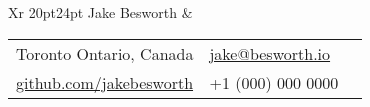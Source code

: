 \documentclass[9pt]{extarticle}
\makeatletter
\newcommand\HUGE{\@setfontsize\Huge{20pt}{24pt}}
\makeatother
\begin{document}
{
    \begin{tabularx}{\textwidth}{Xr}
    {\HUGE\leavevmode\color{em-light} Jake Besworth} &
        \null\hfill\small\begin{tabular}{llX}
            \faMapMarker\space\space\space\color{darkgrey} Toronto Ontario, Canada & \faEnvelope\space\space\color{darkgrey} \href{mailto:jake@besworth.io}{jake@besworth.io} \\[3px]
            \faGithub\space\space\color{darkgrey} \href{https://github.com/jakebesworth}{github.com/jakebesworth} & {\large\faMobilePhone}\space\space\space\color{darkgrey} +1 (000) 000 0000 \\[10px]
        \end{tabular}
    \end{tabularx}

    {\color{lightgrey}{\centerline{\rule{17cm}{0.4pt}}}}
}
\end{document}
